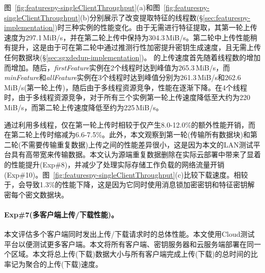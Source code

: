 图~\ref{fig:featurespy-singleClientThroughput}(a)和图~\ref{fig:featurespy-singleClientThroughput}(b)分别展示了改变提取特征的线程数(\S\ref{sec:featurespy-implementation})时\prototype 三种实例的性能变化。由于\sysnameS 无需进行特征提取，其第一轮上传速度为297.1\,MiB/s，并在第二轮上传中保持为304.3\,MiB/s。第二轮中上传性能稍有提升，这是由于\sysnameS 可在第二轮中通过推测行性加密提升密钥生成速度，且无需上传任何数据块(\S\ref{sec:sgxdedup-implementation})。
\prototype 的上传速度首先随着线程数的增加而增加。随后，\textit{firstFeature}实例在2个线程时达到峰值为265.3\,MiB/s，而\textit{minFeature}和\textit{allFeature}实例在3个线程时达到峰值分别为261.3\,MiB/s和262.6\,MiB/s(第一轮上传)，随后由于多线程资源竞争，性能在逐渐下降。在4个线程时，由于多线程资源竞争，对于所有三个实例第一轮上传速度降低至大约为220\,MiB/s，而第二轮上传速度降低至约为225\,MiB/s。

通过利用多线程，\prototype 仅在第一轮上传时相较于\sysnameS 仅产生8.0-12.0\%的额外性能开销，而在第二轮上传时缩减为6.6-7.5\%。此外，本文观察到第一轮(传输所有数据块)和第二轮(不需要传输重复数据)上传之间的性能差异很小，这是因为本文的LAN测试平台具有高带宽来传输数据。本文认为源端重复数据删除在实际云部署中带来了显着的性能提升(Exp\#8)，并减少了处理实际存储工作负载的网络流量开销(Exp\#10)。图~\ref{fig:featurespy-singleClientThroughput}(c)比较下载速度。相较于\sysnameS，\prototype 会导致1.3\%的性能下降，这是因为它同时使用消息锁加密密钥和特征密钥解密每个密文数据块。

\paragraph*{Exp\#7(多客户端上传/下载性能)。}
本文评估多个客户端同时发出上传/下载请求时的总体性能。本文使用Cloud测试平台以便测试更多客户端。本文将所有客户端、密钥服务器和云服务端部署在同一个区域。本文将总上传(下载)数据大小与所有客户端完成上传(下载)的总时间的比率记为聚合的上传(下载)速度。

